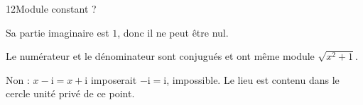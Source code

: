 \begin{corrige}{12}{Module constant ?}
\begin{questions}
\item Sa partie imaginaire est $1$, donc il ne peut être nul.
\item Le numérateur et le dénominateur sont conjugués et ont même module $\sqrt{x^2+1}$.
\item Non : $x-\mathrm i=x+\mathrm i$ imposerait $-\mathrm i=\mathrm i$, impossible. Le lieu est contenu dans le cercle unité privé de ce point.
\end{questions}
\end{corrige}
